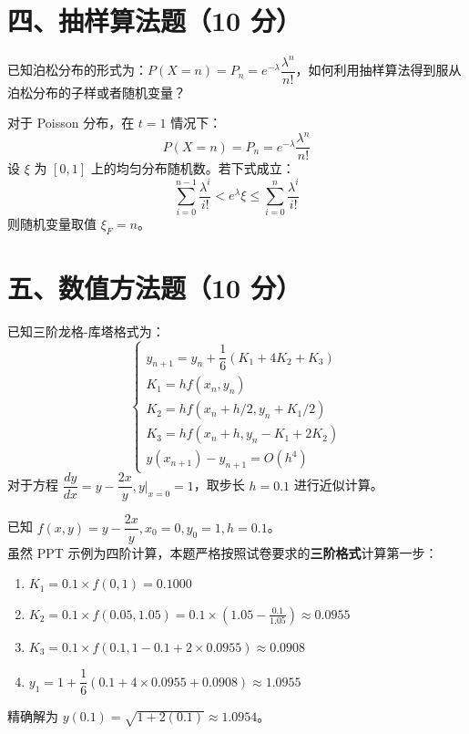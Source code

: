 \documentclass[11pt, a4paper]{article}
\begin{document}
\section*{四、抽样算法题（10 分）}
已知泊松分布的形式为：$P(X=n) = P_n = e^{-\lambda} \dfrac{\lambda^n}{n!}$，如何利用抽样算法得到服从泊松分布的子样或者随机变量？

\begin{tcolorbox}[colback=white, colframe=black, title=【解答】（第二章87页）]
对于 Poisson 分布，在 $t=1$ 情况下：
\begin{equation}
    P(X=n) = P_n = e^{-\lambda} \frac{\lambda^n}{n!}
\end{equation}
设 $\xi$ 为 $[0, 1]$ 上的均匀分布随机数。若下式成立：
\begin{equation}
    \sum_{i=0}^{n-1} \frac{\lambda^i}{i!} < e^{\lambda} \xi \leq \sum_{i=0}^{n} \frac{\lambda^i}{i!}
\end{equation}
则随机变量取值 $\xi_F = n$。
\end{tcolorbox}

\section*{五、数值方法题（10 分）}
已知三阶龙格-库塔格式为：
\begin{equation}
\begin{cases}
    y_{n+1} = y_n + \dfrac{1}{6}(K_1 + 4K_2 + K_3) \\
    K_1 = h f(x_n, y_n) \\
    K_2 = h f(x_n + h/2, y_n + K_1/2) \\
    K_3 = h f(x_n + h, y_n - K_1 + 2K_2) \\
    y(x_{n+1}) - y_{n+1} = O(h^4) \text{}
\end{cases}
\end{equation}
对于方程 $\dfrac{dy}{dx} = y - \dfrac{2x}{y}, y|_{x=0}=1$，取步长 $h=0.1$ 进行近似计算。

\begin{tcolorbox}[colback=white, colframe=black, title=【解答】（第四章）]
已知 $f(x, y) = y - \dfrac{2x}{y}, x_0=0, y_0=1, h=0.1$。\\
虽然 PPT 示例为四阶计算，本题严格按照试卷要求的\textbf{三阶格式}计算第一步：
\begin{enumerate}
    \item $K_1 = 0.1 \times f(0, 1) = 0.1000$
    \item $K_2 = 0.1 \times f(0.05, 1.05) = 0.1 \times (1.05 - \frac{0.1}{1.05}) \approx 0.0955$
    \item $K_3 = 0.1 \times f(0.1, 1 - 0.1 + 2 \times 0.0955) \approx 0.0908$
    \item $y_1 = 1 + \dfrac{1}{6}(0.1 + 4 \times 0.0955 + 0.0908) \approx 1.0955$
\end{enumerate}
精确解为 $y(0.1) = \sqrt{1 + 2(0.1)} \approx 1.0954$。
\end{tcolorbox}
\end{document}
